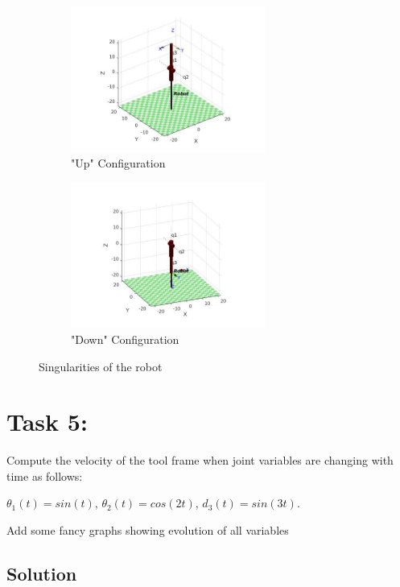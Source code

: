 \documentclass[12pt, a4paper]{report}
\begin{document}
\begin{figure}[H]
	\centering
	\begin{subfigure}[t]{0.5\textwidth}
		\centering
		\includegraphics[width=0.7\textwidth]{Image9_1} %
	\caption{"Up" Configuration} %
	\end{subfigure}%
	\begin{subfigure}[t]{0.5\textwidth}
		\centering
		\includegraphics[width=0.7\textwidth]{Image9_2} %
	\caption{"Down" Configuration} %
	\end{subfigure}%
	\caption{Singularities of the robot}
	\label{fig:mesh9}
\end{figure}


\section*{Task 5:}
Compute the velocity of the tool frame when joint variables are changing with time as follows:

{\centering
$\theta_1(t) = sin(t)$, $\theta_2(t) = cos(2t)$, $d_3(t) = sin(3t)$.
}

Add some fancy graphs showing evolution of all variables


{\centering
\subsection*{Solution}
}
\end{document}
